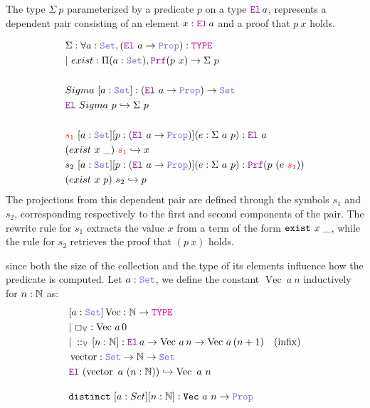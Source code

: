 \begin{definition}\label{dep-pair-def}
The type $\Sigma~p$ parameterized by a predicate $p$ on a type $\el\,a$, represents a dependent pair consisting of an element $x : \el\,a$ and a proof that $p~x$ holds.

\begin{align*}
&\Sigma : \forall a : \set{}, (\el{}~a \ra \prop): \type \\
&|~exist : \Pi (a : \set{}), \prf (p~x) \ra \Sigma~p \\
&\\
& Sigma~[a: \set{}]: (\el{}~a \ra \prop) \ra \set{} \\
& \el{}~Sigma~p \re \Sigma~p \\
&\\
& \textcolor{red}{s_1}~[a: \set{}] [p:(\el{}~a \ra \prop)] (e: \Sigma~a~p): \el{}~a \\
& (exist~x~\_)~\textcolor{red}{s_1} \re x\\
& s_2~[a: \set{}] [p:(\el{}~a \ra \prop)] (e: \Sigma~a~p): \prf{}(p~(e~\textcolor{red}{s_1})) \\
& (exist~x~p)~s_2 \re p\\
\end{align*}
The projections from this dependent pair are defined through the symbols $s_1$ and $s_2$, corresponding respectively to the first and second components of the pair.
The rewrite rule for $s_1$ extracts the value $x$ from a term of the form $\texttt{\upshape{exist}}~x~\_$, while the rule for $s_2$ retrieves the proof that $(p~x)$ holds.
\end{definition}

\begin{definition}\label{def:dependent-vector}
since both the size of the collection and the type of its elements influence how the predicate is computed.
Let \( a : \set \), we define the constant \( \mathop{\mathrm{Vec}}~a~n \) inductively for \( n : \mathbb{N} \) as:
\begin{align*}
&[a: \set] \mathop{\mathrm{Vec}}: \N \ra \type \\
&|~\Box_\bb{V} : \mathop{\mathrm{Vec}}\,a\, 0 \\
&|~\mathbin{::}_\bb{V}\,[n:\N]: \el\,a \ra \mathop{\mathrm{Vec}}\,a\,n \ra  \mathop{\mathrm{Vec}}\,a\,(n +1) \quad (\text{infix})\\
&\mathop{\mathrm{vector}}: \set \ra \N \ra \set \\
&\el~(\mathop{\mathrm{vector}}~a~(n: \N)) \re \mathop{\mathrm{Vec}}~a~n \\[1em]
& \kw{distinct}~[a: Set] [n: \N] : \kw{Vec}~a~n \ra \prop
\end{align*}
\end{definition}